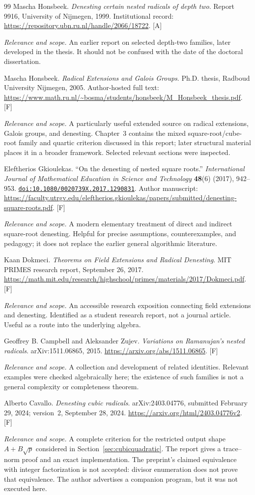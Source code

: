 \documentclass[11pt,letterpaper]{article}
\numberwithin{equation}{section}
\theoremstyle{definition}
\theoremstyle{remark}
\newcommand{\doi}[1]{\href{https://doi.org/#1}{\nolinkurl{doi:#1}}}
\newcommand{\status}[1]{\textsf{\small[#1]}}
\newcommand{\entrynote}[1]{\par\smallskip\noindent\emph{Relevance and scope.} #1}
\begin{document}
\begin{thebibliography}{99}
Mascha Honsbeek. \emph{Denesting certain nested radicals of depth two}. Report 9916, University of Nijmegen, 1999. Institutional record: \url{https://repository.ubn.ru.nl/handle/2066/18722}. \status{A}
\entrynote{An earlier report on selected depth-two families, later developed in the thesis. It should not be confused with the date of the doctoral dissertation.}

Mascha Honsbeek. \emph{Radical Extensions and Galois Groups}. Ph.D. thesis, Radboud University Nijmegen, 2005. Author-hosted full text: \url{https://www.math.ru.nl/~bosma/students/honsbeek/M_Honsbeek_thesis.pdf}. \status{F}
\entrynote{A particularly useful extended source on radical extensions, Galois groups, and denesting. Chapter~3 contains the mixed square-root/cube-root family and quartic criterion discussed in this report; later structural material places it in a broader framework. Selected relevant sections were inspected.}

Eleftherios Gkioulekas. ``On the denesting of nested square roots.'' \emph{International Journal of Mathematical Education in Science and Technology} \textbf{48}(6) (2017), 942--953. \doi{10.1080/0020739X.2017.1290831}. Author manuscript: \url{https://faculty.utrgv.edu/eleftherios.gkioulekas/papers/submitted/denesting-square-roots.pdf}. \status{F}
\entrynote{A modern elementary treatment of direct and indirect square-root denesting. Helpful for precise assumptions, counterexamples, and pedagogy; it does not replace the earlier general algorithmic literature.}

Kaan Dokmeci. \emph{Theorems on Field Extensions and Radical Denesting}. MIT PRIMES research report, September 26, 2017. \url{https://math.mit.edu/research/highschool/primes/materials/2017/Dokmeci.pdf}. \status{F}
\entrynote{An accessible research exposition connecting field extensions and denesting. Identified as a student research report, not a journal article. Useful as a route into the underlying algebra.}

Geoffrey B. Campbell and Aleksander Zujev. \emph{Variations on Ramanujan's nested radicals}. arXiv:1511.06865, 2015. \url{https://arxiv.org/abs/1511.06865}. \status{F}
\entrynote{A collection and development of related identities. Relevant examples were checked algebraically here; the existence of such families is not a general complexity or completeness theorem.}

Alberto Cavallo. \emph{Denesting cubic radicals}. arXiv:2403.04776, submitted February 29, 2024; version~2, September 28, 2024. \url{https://arxiv.org/html/2403.04776v2}. \status{F}
\entrynote{A complete criterion for the restricted output shape $A+B\sqrt p$ considered in Section~\ref{sec:cubicquadratic}. The report gives a trace--norm proof and an exact implementation. The preprint's claimed equivalence with integer factorization is not accepted: divisor enumeration does not prove that equivalence. The author advertises a companion program, but it was not executed here.}


\end{thebibliography}
\end{document}
